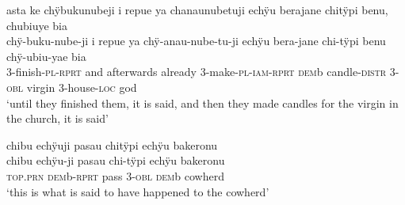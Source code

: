 \newpage
\ea%
\begingl 
\glpreamble asta ke chÿbukunubeji i repue ya chanaunubetuji echÿu berajane chitÿpi benu, chubiuye bia\\
 chÿ-buku-nube-ji i repue ya chÿ-anau-nube-tu-ji echÿu bera-jane chi-tÿpi benu chÿ-ubiu-yae bia\\ 
 3-finish-\textsc{pl}-\textsc{rprt} and afterwards already 3-make-\textsc{pl}-\textsc{iam}-\textsc{rprt} \textsc{dem}b candle-\textsc{distr} 3-\textsc{obl} virgin 3-house-\textsc{loc} god\\ 
\glft ‘until they finished them, it is said, and then they made candles for the virgin in the church, it is said’\\ 
\endgl
\xe

\ea%
\begingl 
\glpreamble chibu echÿuji pasau chitÿpi echÿu bakeronu\\
\gla chibu echÿu-ji pasau chi-tÿpi echÿu bakeronu\\ 
\textsc{top.prn} \textsc{dem}b-\textsc{rprt} pass 3-\textsc{obl} \textsc{dem}b cowherd\\ 
\glft ‘this is what is said to have happened to the cowherd’\\ 
\endgl
\xe
